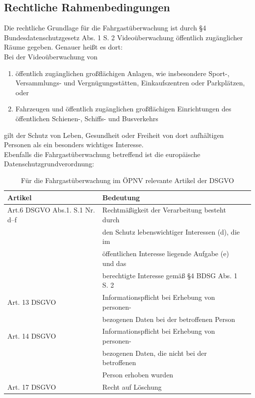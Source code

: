 \subsection{Rechtliche Rahmenbedingungen}
Die rechtliche Grundlage für die Fahrgastüberwachung ist durch §4 Bundesdatenschutzgesetz Abs. 1 S. 2 \glqq{} Videoüberwachung öffentlich zugänglicher Räume\grqq{}
gegeben. Genauer heißt es dort:\\
\glqq{}Bei der Videoüberwachung von
\begin{enumerate}
    \item öffentlich zugänglichen großflächigen Anlagen, wie insbesondere Sport-,\\ Versammlungs- und Vergnügungsstätten, Einkaufszentren oder Parkplätzen, oder
    \item Fahrzeugen und öffentlich zugänglichen großflächigen Einrichtungen des öffentlichen Schienen-, Schiffs- und Busverkehrs
\end{enumerate}
gilt der Schutz von Leben, Gesundheit oder Freiheit von dort aufhältigen Personen als ein besonders wichtiges Interesse.\grqq{} \cite{Bundestag.2018}\\
Ebenfalls die Fahrgastüberwachung betreffend ist die europäische Datenschutzgrundverordnung:
\begin{table}
    \caption{Für die Fahrgastüberwachung im ÖPNV relevante Artikel der DSGVO \cite{EuropaischeUnion.}}\label{tab:dsgvo}
    \begin{tabular}{|l|l|l|}
        \hline
        Artikel                         & Bedeutung                                           \\
        \hline
        Art.6 DSGVO Abs.1. S.1 Nr. d--f & Rechtmäßigkeit der Verarbeitung besteht durch       \\
                                        & den Schutz lebenswichtiger Interessen (d), die im   \\
                                        & öffentlichen Interesse liegende Aufgabe (e) und das \\
                                        & berechtigte Interesse gemäß §4 BDSG  Abs. 1 S. 2    \\ [1ex]
        Art. 13 DSGVO                   & Informationspflicht bei Erhebung von personen-      \\
                                        & bezogenen Daten bei der betroffenen Person          \\ [1ex]
        Art. 14 DSGVO                   & Informationspflicht bei Erhebung von personen-      \\
                                        & bezogenen Daten, die nicht bei der betroffenen      \\
                                        & Person erhoben wurden                               \\ [1ex]
        Art. 17 DSGVO                   & Recht auf Löschung                                  \\
        \hline
    \end{tabular}
\end{table}


